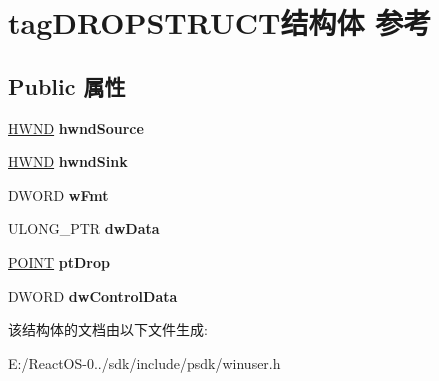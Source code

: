 \hypertarget{structtag_d_r_o_p_s_t_r_u_c_t}{}\section{tag\+D\+R\+O\+P\+S\+T\+R\+U\+C\+T结构体 参考}
\label{structtag_d_r_o_p_s_t_r_u_c_t}
\subsection*{Public 属性}
\begin{DoxyCompactItemize}
\item 
\mbox{\label{structtag_d_r_o_p_s_t_r_u_c_t_a616f03db6ea04e6728b22819cb131396}} 
\hyperlink{interfacevoid}{H\+W\+ND} {\bfseries hwnd\+Source}
\item 
\mbox{\label{structtag_d_r_o_p_s_t_r_u_c_t_a228858a49bfb34ffe41aba88a1eebefd}} 
\hyperlink{interfacevoid}{H\+W\+ND} {\bfseries hwnd\+Sink}
\item 
\mbox{\label{structtag_d_r_o_p_s_t_r_u_c_t_aeb0487b99245d8f37baf62346a136d67}} 
D\+W\+O\+RD {\bfseries w\+Fmt}
\item 
\mbox{\label{structtag_d_r_o_p_s_t_r_u_c_t_aaa56d768ca2e39ce3522e5ea17b080c5}} 
U\+L\+O\+N\+G\+\_\+\+P\+TR {\bfseries dw\+Data}
\item 
\mbox{\label{structtag_d_r_o_p_s_t_r_u_c_t_aaa5d3ba1ce3d64c0c82d0a8233060077}} 
\hyperlink{structtag_p_o_i_n_t}{P\+O\+I\+NT} {\bfseries pt\+Drop}
\item 
\mbox{\label{structtag_d_r_o_p_s_t_r_u_c_t_ad1701b19ccfb590a2007384a09d22802}} 
D\+W\+O\+RD {\bfseries dw\+Control\+Data}
\end{DoxyCompactItemize}


该结构体的文档由以下文件生成\+:\begin{DoxyCompactItemize}
\item 
E\+:/\+React\+O\+S-\/0../sdk/include/psdk/winuser.\+h\end{DoxyCompactItemize}

